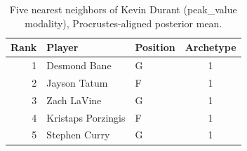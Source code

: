 \begin{table}[htbp]
  \centering\small
  \begin{tabular}{rllc}
    \toprule
    Rank & Player & Position & Archetype \\
    \midrule
    1 & Desmond Bane & G & 1 \\
    2 & Jayson Tatum & F & 1 \\
    3 & Zach LaVine & G & 1 \\
    4 & Kristaps Porzingis & F & 1 \\
    5 & Stephen Curry & G & 1 \\
    \bottomrule
  \end{tabular}
  \caption{Five nearest neighbors of Kevin Durant (peak_value modality), Procrustes-aligned posterior mean.}
  \label{tab:Kevin_Durant_neighbors_peak_value}
\end{table}

